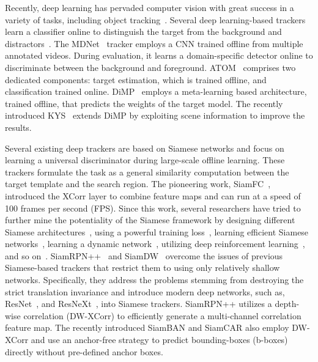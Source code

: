 \documentclass[10pt,twocolumn,letterpaper,final]{cvpr}
\begin{document}
Recently, deep learning has pervaded computer vision with great success in a variety of tasks, including object tracking~\cite{wang2013learning,bertinetto2016learning,nam2016learning,tao2016siamese,bertinetto2016fully,held2016learning,yun2017action,kosiorek2017hierarchical,song2018vital,park2018meta,pu2018deep,danelljan2019atom}.
Several deep learning-based trackers learn a classifier online to distinguish the target from the background and distractors~\cite{wang2013learning,nam2016learning,song2017crest,sun2018correlation,danelljan2019atom}. The MDNet~\cite{nam2016learning} tracker employs a CNN trained offline from multiple annotated videos. During evaluation, it learns a domain-specific detector online to discriminate between the background and foreground. ATOM~\cite{danelljan2019atom} comprises two dedicated components: target estimation, which is trained offline, and classification trained online. DiMP~\cite{bhat2019learning} employs a meta-learning based architecture, trained offline, that predicts the weights of the target model. The recently introduced KYS~\cite{bhat2020know} extends DiMP by exploiting scene information to improve the results. 








Several existing deep trackers \cite{bertinetto2016fully,li2018high,li2019siamrpn,chen2020siamese,guo2020siamcar,xu2020siamfc++} are based on Siamese networks and focus on learning a universal discriminator during large-scale offline learning.
These trackers formulate the task as a general similarity computation between the target template and the search region. The pioneering work, SiamFC~\cite{bertinetto2016fully}, introduced the XCorr layer to combine feature maps and can run at a speed of 100 frames per second (FPS).  Since this work, several researchers have tried to further mine the potentiality of the Siamese framework by designing different Siamese architectures~\cite{he2018twofold,wang2018learning,zhang2018structured,dong2019quadruplet}, using a powerful training loss~\cite{dong2018triplet}, learning efficient Siamese networks~\cite{liu2019teacher-students}, learning a dynamic network~\cite{guo2017learning}, utilizing deep reinforcement learning~\cite{huang2017learning,dong2018hyperparameter,dong2019dynamical}, and so on~\cite{wang2018sint,yang2018learning,shen2019visual,liang2020local}. 
SiamRPN++~\cite{li2019siamrpn} and SiamDW~\cite{zhang2019deeper} overcome the issues of previous Siamese-based trackers that restrict them to using only relatively shallow networks. Specifically, they address the problems stemming from destroying the strict translation invariance and introduce modern deep networks, such as, ResNet~\cite{he2016deep}, and ResNeXt~\cite{xie2017aggregated}, into Siamese trackers. SiamRPN++ utilizes a depth-wise  correlation (DW-XCorr) to efficiently generate a multi-channel correlation feature map. The recently introduced SiamBAN\cite{chen2020siamese} and SiamCAR\cite{guo2020siamcar} also employ DW-XCorr and use an anchor-free strategy to predict bounding-boxes (b-boxes) directly without pre-defined anchor boxes.
\end{document}
